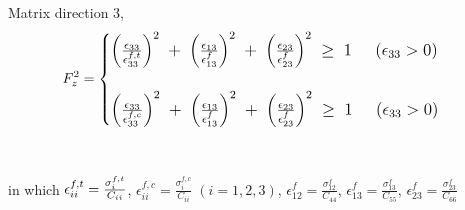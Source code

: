 \documentclass[a4paper,14pt]{extarticle}
\begin{document}
\\
\\
Matrix direction 3,
\\
\begin{equation}
\large{F_{z}^{2} =  
	\begin{cases}

	\Big(\frac{\epsilon_{33}}{\epsilon_{33}^{f,t}}\Big)^{2} \; + \; \Big(\frac{\epsilon_{13}}{\epsilon_{13}^{f}}\Big)^{2} \; + \; \Big(\frac{\epsilon_{23}}{\epsilon_{23}^{f}}\Big)^{2} \; \geq  \; 1 \; \; \; \; \;  (\epsilon_{33}  >  0) \\

\\
	\Big(\frac{\epsilon_{33}}{\epsilon_{33}^{f,c}}\Big)^{2} \; + \; \Big(\frac{\epsilon_{13}}{\epsilon_{13}^{f}}\Big)^{2} \; + \; \Big(\frac{\epsilon_{23}}{\epsilon_{23}^{f}}\Big)^{2} \; \geq  \; 1 \; \; \; \; \;  (\epsilon_{33}  >  0) \\



	\end{cases}}
\end{equation}
\\
\\
in which  $\LARGE{\epsilon_{ii}^{f,t}=\frac{\sigma_{i}^{f,t}}{C_{ii}}}$,  $\epsilon_{ii}^{f,c}  =   \frac{\sigma_{i}^{f,c}}{C_{ii}} \; (i = 1,2,3)$,  $\epsilon_{12}^{f}  =   \frac{\sigma_{12}^{f}}{C_{44}}$,   $\epsilon_{13}^{f}  =  \frac{\sigma_{13}^{f}}{C_{55}}$,  $\epsilon_{23}^{f}  =   \frac{\sigma_{23}^{f}}{C_{66}}$
\end{document}
